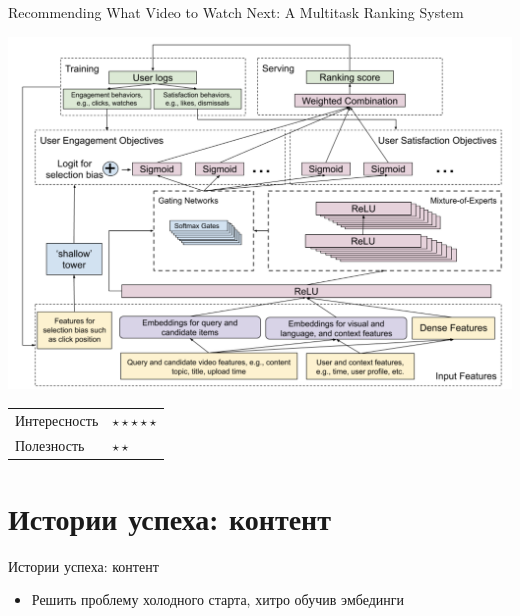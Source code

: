 \documentclass[11pt,aspectratio=169]{beamer}
\begin{document}
\begin{frame}{Recommending What Video to Watch Next: A Multitask Ranking System \cite{RANKING}}

\begin{center}
\includegraphics[scale=0.25]{images/multitask.png}
\end{center}

\begin{tabular}{l l}
Интересность & $\star\star\star\star\star$ \\
Полезность & $\star\star$
\end{tabular}

\end{frame}

\section{Истории успеха: контент}

\begin{frame}{Истории успеха: контент}

\begin{tcolorbox}[colback=info!5,colframe=info!80,title=Как оставить след в науке]
\begin{itemize}
\item Решить проблему холодного старта, хитро обучив эмбединги
\end{itemize}
\end{tcolorbox}

\end{frame}
\end{document}
